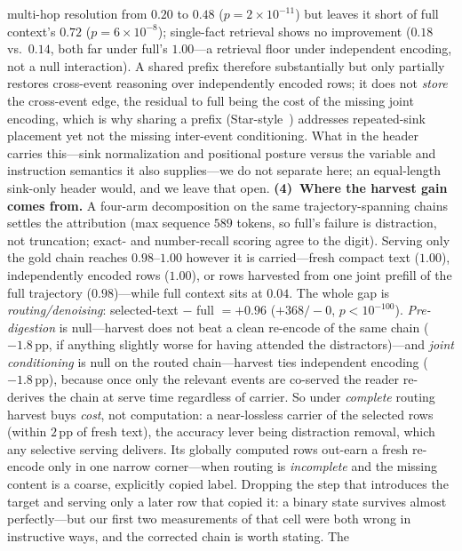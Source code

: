 \documentclass{article} %
\newcommand{\pp}{\,\mathrm{pp}}
\begin{document}
multi-hop resolution from $0.20$ to $0.48$ ($p{=}2{\times}10^{-11}$) but leaves it short of
full context's $0.72$ ($p{=}6{\times}10^{-8}$); single-fact retrieval shows no improvement
($0.18$ vs.\ $0.14$, both far under full's $1.00$---a retrieval floor under independent
encoding, not a null interaction). A shared prefix therefore substantially but only partially
restores cross-event reasoning over independently encoded rows; it does not \emph{store} the
cross-event edge, the residual to full being the cost of the missing joint encoding, which is
why sharing a prefix (Star-style~\citep{star}) addresses repeated-sink placement yet not the
missing inter-event conditioning. What in the header carries this---sink normalization and
positional posture versus the variable and instruction semantics it also supplies---we do not
separate here; an equal-length sink-only header would, and we leave that open.
\textbf{(4)~Where the harvest gain comes from.} A four-arm decomposition on the same
trajectory-spanning chains settles the attribution (max sequence $589$ tokens, so full's
failure is distraction, not truncation; exact- and number-recall scoring agree to the digit).
Serving only the gold chain reaches $0.98$--$1.00$ however it is carried---fresh compact text
($1.00$), independently encoded rows ($1.00$), or rows harvested from one joint prefill of the
full trajectory ($0.98$)---while full context sits at $0.04$. The whole gap is
\emph{routing/denoising}: selected-text $-$ full $={+}0.96$ ($+368/{-}0$, $p{<}10^{-100}$).
\emph{Pre-digestion} is null---harvest does not beat a clean re-encode of the same chain
($-1.8\pp$, if anything slightly worse for having attended the distractors)---and
\emph{joint conditioning} is null on the routed chain---harvest ties independent encoding
($-1.8\pp$), because once only the relevant events are co-served the reader re-derives the
chain at serve time regardless of carrier. So under \emph{complete} routing harvest buys
\emph{cost}, not computation: a near-lossless carrier of the selected rows (within $2\pp$ of
fresh text), the accuracy lever being distraction removal, which any selective serving
delivers. Its globally computed rows out-earn a fresh re-encode only in one narrow
corner---when routing is \emph{incomplete} and the missing content is a coarse, explicitly
copied label. Dropping the step that introduces the target and serving only a later row that
copied it: a binary state survives almost perfectly---but our first two measurements of that
cell were both wrong in instructive ways, and the corrected chain is worth stating. The
\end{document}
